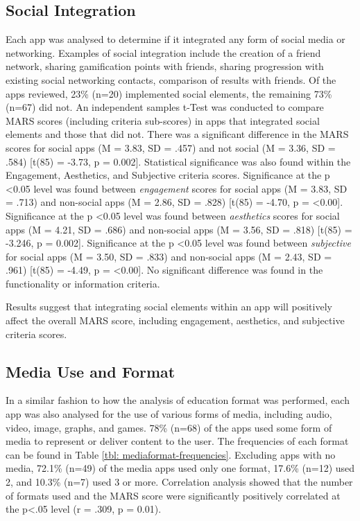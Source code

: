 \subsection{Social Integration} \label{subsection: social-integration}
Each app was analysed to determine if it integrated any form of social media or networking. Examples of social integration include the creation of a friend network, sharing gamification points with friends, sharing progression with existing social networking contacts, comparison of results with friends. Of the apps reviewed, 23\% (n=20) implemented social elements, the remaining 73\% (n=67) did not. An independent samples t-Test was conducted to compare MARS scores (including criteria sub-scores) in apps that integrated social elements and those that did not. There was a significant difference in the MARS scores for social apps (M = 3.83, SD = .457) and not social (M = 3.36, SD = .584) [t(85) = -3.73, p = 0.002]. Statistical significance was also found within the Engagement, Aesthetics, and Subjective criteria scores.
Significance at the p \textless 0.05 level was found between \textit{engagement} scores for social apps (M = 3.83, SD = .713) and non-social apps (M = 2.86, SD = .828) [t(85) = -4.70, p = \textless0.00]. Significance at the p \textless 0.05 level was found between \textit{aesthetics} scores for social apps (M = 4.21, SD = .686) and non-social apps (M = 3.56, SD = .818) [t(85) = -3.246, p = 0.002]. Significance at the p \textless 0.05 level was found between \textit{subjective} for social apps (M = 3.50, SD = .833) and non-social apps (M = 2.43, SD = .961) [t(85) = -4.49, p = \textless0.00]. No significant difference was found in the functionality or information criteria.

Results suggest that integrating social elements within an app will positively affect the overall MARS score, including engagement, aesthetics, and subjective criteria scores.

\subsection{Media Use and Format}
In a similar fashion to how the analysis of education format was performed, each app was also analysed for the use of various forms of media, including audio, video, image, graphs, and games. 78\% (n=68) of the apps used some form of media to represent or deliver content to the user. The frequencies of each format can be found in Table \ref{tbl: mediaformat-frequencies}. Excluding apps with no media, 72.1\% (n=49) of the media apps used only one format, 17.6\% (n=12) used 2, and 10.3\% (n=7) used 3 or more.  Correlation analysis showed that the number of formats used and the MARS score were significantly positively correlated at the p\textless.05 level (r = .309, p = 0.01).

